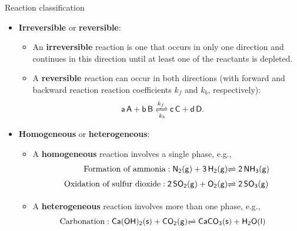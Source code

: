 %
\begin{frame}{Reaction classification}
	\begin{itemize}
		\item \alert{\bf Irreversible} or \alert{\bf reversible}:
		\begin{itemize}
			\item An {\bf irreversible} reaction is one that occurs in only one direction and continues in this direction until at least one of the reactants is depleted.
			\item A {\bf reversible} reaction can occur in both directions (with forward and backward reaction reaction coefficients $k_f$ and $k_b$, respectively):
			\[	
			\mathsf{a\,A + b\,B} \xrightleftharpoons[k_b]{k_f} \mathsf{c\,C + d\,D}.
			\quad
			\]
		\end{itemize}
		\item \alert{\bf Homogeneous} or \alert{\bf heterogeneous}:
		\begin{itemize}
			\item A {\bf homogeneous} reaction involves a single phase, e.g., 
			\begin{alignat*}{2}
				\mbox{Formation of ammonia}:  \mathsf{N_2(g) + 3\,H_2(g) } & \mathsf{\xrightleftharpoons[]{} 2\,NH_3(g)}\\
				\mbox{Oxidation of sulfur dioxide}: \mathsf{2\,SO_2(g) + O_2(g) } & \mathsf{\xrightleftharpoons[]{} 2\,SO_3(g)} 
			\end{alignat*}
			\item A {\bf heterogeneous} reaction involves more than one phase, e.g., 
			\begin{alignat*}{2}
				\mbox{Carbonation} : \mathsf{Ca(OH)_2(s) + CO_2(g)} & \mathsf{\xrightleftharpoons[]{} CaCO_3(s) + H_2O(l)}
			\end{alignat*}
		\end{itemize}
		
	\end{itemize}
\end{frame}
%

